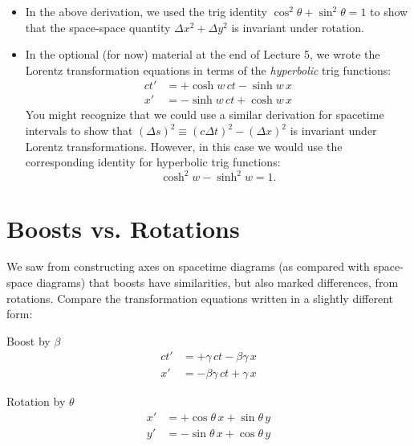 \documentclass[11pt, letterpaper, openany]{book}
\begin{document}
\begin{itemize}
    \item In the above derivation, we used the trig identity $\cos^2\theta + \sin^2\theta = 1$ to show that the space-space quantity $\Delta x^2 + \Delta y^2$ is invariant under rotation.
    \item In the optional (for now) material at the end of Lecture 5, we wrote the Lorentz transformation equations in terms of the \textit{hyperbolic} trig functions:
\begin{align*}
    ct' &= +\cosh w \, ct - \sinh w \, x \\
    x'  &= -\sinh w \, ct + \cosh w \, x 
\end{align*}
You might recognize that we could use a similar derivation for spacetime intervals to show that $(\Delta s)^2 \equiv (c\Delta t)^2 - (\Delta x)^2$ is invariant under Lorentz transformations. However, in this case we would use the corresponding identity for hyperbolic trig functions:
\[ \cosh^2 w - \sinh^2 w = 1. \]
\end{itemize}

\section{Boosts vs. Rotations}

We saw from constructing axes on spacetime diagrams (as compared with space-space diagrams) that boosts have similarities, but also marked differences, from rotations. Compare the transformation equations written in a slightly different form:

\begin{minipage}[t]{0.45\textwidth}
\begin{center}
    Boost by $\beta$
    \begin{align*}
        ct' &= +\gamma \, ct - \beta\gamma \, x \\
        x'  &= -\beta\gamma \, ct + \gamma \, x
    \end{align*}
\end{center}
\end{minipage}
\begin{minipage}[t]{0.45\textwidth}
\begin{center}
    Rotation by $\theta$
    \begin{align*}
        x' &= +\cos\theta \, x + \sin\theta \, y \\
        y' &= -\sin\theta \, x + \cos\theta \, y
    \end{align*}
\end{center}
\end{minipage}
\end{document}
